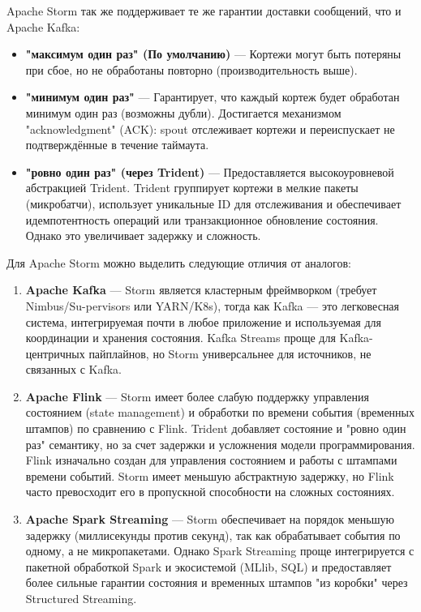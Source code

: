             
            Apache Storm так же поддерживает те же гарантии доставки сообщений, что и Apache Kafka:
            \begin{itemize}
                \item \textbf{"максимум один раз" (По умолчанию)} — Кортежи могут быть потеряны при сбое, но не обработаны повторно (производительность выше).
                \item \textbf{"минимум один раз"} — Гарантирует, что каждый кортеж будет обработан минимум один раз (возможны дубли). Достигается механизмом "acknowledgment" (ACK): spout отслеживает кортежи и переиспускает не подтверждённые в течение таймаута.
                \item \textbf{"ровно один раз" (через Trident)} — Предоставляется высокоуровневой абстракцией Trident. Trident группирует кортежи в мелкие пакеты (микробатчи), использует уникальные ID для отслеживания и обеспечивает идемпотентность операций или транзакционное обновление состояния. Однако это увеличивает задержку и сложность.
            \end{itemize}
            
            Для Apache Storm можно выделить следующие отличия от аналогов:
            \begin{enumerate}
                \item \textbf{Apache Kafka} — Storm является кластерным фреймворком (требует Nimbus/Su-pervisors или YARN/K8s), тогда как Kafka — это легковесная система, интегрируемая почти в любое приложение и используемая для координации и хранения состояния. Kafka Streams проще для Kafka-центричных пайплайнов, но Storm универсальнее для источников, не связанных с Kafka.
                \item \textbf{Apache Flink} — Storm имеет более слабую поддержку управления состоянием (state management) и обработки по времени события (временных штампов) по сравнению с Flink. Trident добавляет состояние и "ровно один раз" семантику, но за счет задержки и усложнения модели программирования. Flink изначально создан для управления состоянием и работы с штампами времени событий. Storm имеет меньшую абстрактную задержку, но Flink часто превосходит его в пропускной способности на сложных состояниях.
                \item \textbf{Apache Spark Streaming} — Storm обеспечивает на порядок меньшую задержку (миллисекунды против секунд), так как обрабатывает события по одному, а не микропакетами. Однако Spark Streaming проще интегрируется с пакетной обработкой Spark и экосистемой (MLlib, SQL) и предоставляет более сильные гарантии состояния и временных штампов "из коробки" через Structured Streaming.
            \end{enumerate}


